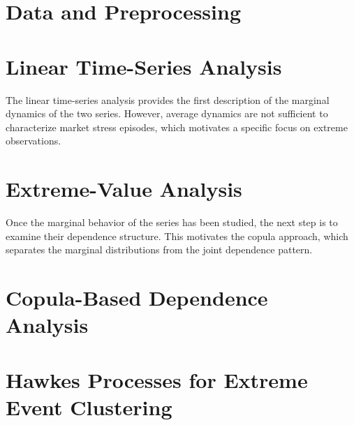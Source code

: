 \documentclass[11pt, a4paper]{article}
\theoremstyle{remark}
\begin{document}
\section{Data and Preprocessing}
\label{sec:data}


\section{Linear Time-Series Analysis}
\label{sec:timeseries}


The linear time-series analysis provides the first description of the marginal dynamics of the two series. However, average dynamics are not sufficient to characterize market stress episodes, which motivates a specific focus on extreme observations.

\section{Extreme-Value Analysis}
\label{sec:extremes}


Once the marginal behavior of the series has been studied, the next step is to examine their dependence structure. This motivates the copula approach, which separates the marginal distributions from the joint dependence pattern.

\section{Copula-Based Dependence Analysis}
\label{sec:copulas}


\section{Hawkes Processes for Extreme Event Clustering}
\label{sec:hawkes}


\end{document}
